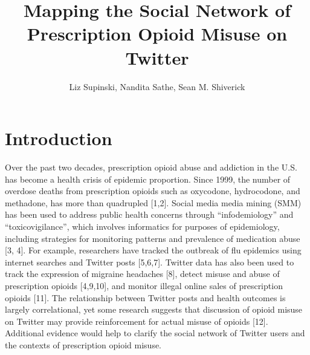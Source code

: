 \documentclass[sigconf]{acmart}
\begin{document}
\title{Mapping the Social Network of Prescription Opioid Misuse on Twitter}


\author{Liz Supinski, Nandita Sathe, Sean M. Shiverick}

\renewcommand{\shortauthors}{Supinski, Sathe, Shiverick}





\maketitle



\section{Introduction}



Over the past two decades, prescription opioid abuse and addiction in the U.S. has become a health crisis of epidemic proportion. Since 1999, the number of overdose deaths from prescription opioids such as oxycodone, hydrocodone, and methadone, has more than quadrupled [1,2]. Social media media mining (SMM) has been used to address public health concerns through “infodemiology” and “toxicovigilance”, which involves informatics for purposes of epidemiology, including strategies for monitoring patterns and prevalence of medication abuse [3, 4]. For example, researchers have tracked the outbreak of flu epidemics using internet searches and Twitter posts [5,6,7]. Twitter data has also been used to track the expression of migraine headaches [8], detect misuse and abuse of prescription opioids [4,9,10], and monitor illegal online sales of prescription opioids [11]. The relationship between Twitter posts and health outcomes is largely correlational, yet some research suggests that discussion of opioid misuse on Twitter may provide reinforcement for actual misuse of opioids [12]. Additional evidence would help to clarify the social network of Twitter users and the contexts of prescription opioid misuse. 
\end{document}
